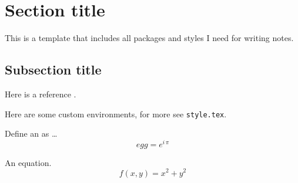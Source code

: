 \documentclass[a4paper]{article}
\begin{document}






\newpage
\tableofcontents
\newpage



\section{Section title}

This is a template that includes all packages and styles I need for writing notes.


\subsection{Subsection title}

Here is a reference \cite{ref_example}.

Here are some custom environments, for more see \texttt{style.tex}.
\begin{definition}[egg]
Define an  as \ldots
\begin{equation}
    egg = e^{i\, \pi}
\end{equation}
\end{definition}

\begin{corollary}

\end{corollary}

An equation.
\begin{equation}
    f(x,y) = x^2 + y^2
\end{equation}
\end{document}
